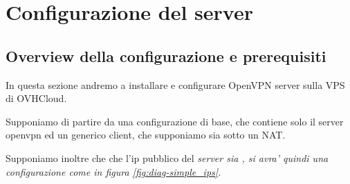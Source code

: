 \chapter{Configurazione del server}
\label{ch:server}


\section{Overview della configurazione e prerequisiti}

In questa sezione andremo a installare e configurare OpenVPN server sulla VPS di OVHCloud.

Supponiamo di partire da una configurazione di base, che contiene solo il server openvpn ed un generico client, che supponiamo sia sotto un NAT.

Supponiamo inoltre che che l'ip pubblico del \it{server} sia , si avra' quindi una configurazione come in figura \ref{fig:diag-simple_ips}.

